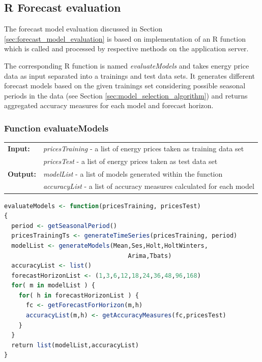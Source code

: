 %





\subsection{R Forecast evaluation}


The forecast model evaluation discussed in Section \ref{sec:forecast_model_evaluation} is based on implementation of an R function which is called and processed by respective methods on the application server. 

The corresponding R function is named \textit{evaluateModels} and takes energy price data as input separated into a trainings and test data sets. It generates different forecast models based on the given trainings set considering possible seasonal periods in the data (see Section \ref{sec:model_selection_algorithm}) and returns aggregated accuracy measures for each model and forecast horizon. 

\subsubsection{Function evaluateModels}

\begin{tabular}{ll}
\textbf{Input:}  & \textit{pricesTraining} - a list of energy prices taken as training data set \\
								 & \textit{pricesTest} - a list of energy prices taken as test data set \\
\textbf{Output:} & \textit{modelList} - a list of models generated within the function \\
								 & \textit{accuracyList} - a list of accuracy measures calculated for each model
\end{tabular}


\begin{lstlisting}[language=R, caption=Function evaluateModels, label={lst:evaluateModelsR}]
evaluateModels <- function(pricesTraining, pricesTest)
{
  period <- getSeasonalPeriod()
  pricesTrainingTs <- generateTimeSeries(pricesTraining, period)
  modelList <- generateModels(Mean,Ses,Holt,HoltWinters, 
	                              Arima,Tbats)						
  accuracyList <- list()
  forecastHorizonList <- (1,3,6,12,18,24,36,48,96,168)
  for( m in modelList ) {
    for( h in forecastHorizonList ) {
      fc <- getForecastForHorizon(m,h)
      accuracyList(m,h) <- getAccuracyMeasures(fc,pricesTest)
    }
  }
  return list(modelList,accuracyList)
}
\end{lstlisting}

